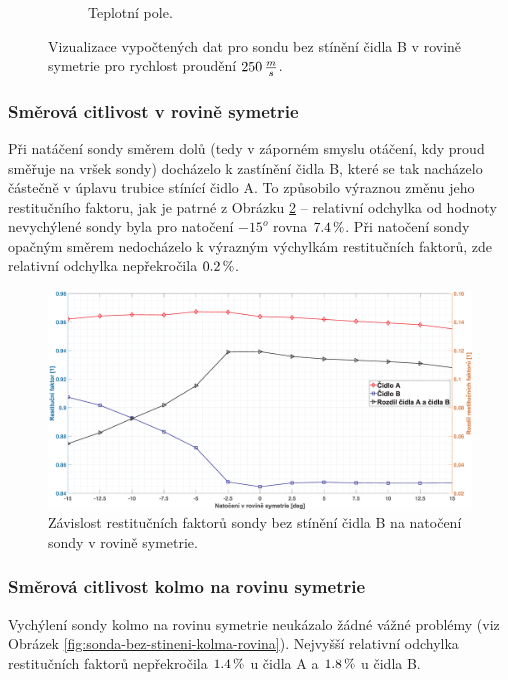 \begin{figure}[ht!]
\begin{subfigure}{0.45\textwidth}
                    \caption{Teplotní pole.}
                \end{subfigure}
                \caption{Vizualizace vypočtených dat pro sondu bez stínění čidla B v rovině symetrie pro rychlost proudění $250 \, \frac{m}{s}$.}
                \label{fig:sonda-bez-stineni-vizualizace}
            \end{figure}


        \newpage
        \subsubsection{Směrová citlivost v rovině symetrie}
            Při natáčení sondy směrem dolů (tedy v záporném smyslu otáčení, kdy proud směřuje na vršek sondy) docházelo k zastínění čidla B, které se tak nacházelo částečně v úplavu trubice stínící čidlo A. To způsobilo výraznou změnu jeho restitučního faktoru, jak je patrné z Obrázku \ref{fig:sonda-bez-stineni-rovina-symetrie} – relativní odchylka od hodnoty nevychýlené sondy byla pro natočení $-15^o$ rovna $7.4 \, \%$. Při natočení sondy opačným směrem nedocházelo k výrazným výchylkám restitučních faktorů, zde relativní odchylka nepřekročila $0.2 \, \%$.
            
            \begin{figure}[ht!]
                \centering
                \includegraphics*[width=\textwidth]{400_SIMULACE_KONSTRUKCNICH_UPRAV/Grafy/01_rovina_symetrie}
                \caption{Závislost restitučních faktorů sondy bez stínění čidla B na natočení sondy v rovině symetrie.}
                \label{fig:sonda-bez-stineni-rovina-symetrie}
            \end{figure}
        \subsubsection{Směrová citlivost kolmo na rovinu symetrie}
            Vychýlení sondy kolmo na rovinu symetrie neukázalo žádné vážné problémy (viz Obrázek \ref{fig:sonda-bez-stineni-kolma-rovina}). Nejvyšší relativní odchylka restitučních faktorů nepřekročila $1.4 \, \%$ u čidla A a $1.8 \, \%$ u čidla B.
            
